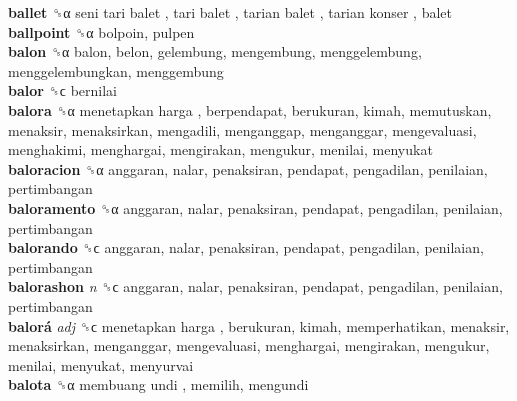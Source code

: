 \textbf{ballet} ␝α   seni tari balet ,  tari balet ,  tarian balet ,  tarian konser , balet  \\
\textbf{ballpoint} ␝α  bolpoin, pulpen  \\
\textbf{balon} ␝α  balon, belon, gelembung, mengembung, menggelembung, menggelembungkan, menggembung  \\
\textbf{balor} ␝ϲ  bernilai  \\
\textbf{balora} ␝α   menetapkan harga , berpendapat, berukuran, kimah, memutuskan, menaksir, menaksirkan, mengadili, menganggap, menganggar, mengevaluasi, menghakimi, menghargai, mengirakan, mengukur, menilai, menyukat  \\
\textbf{baloracion} ␝α  anggaran, nalar, penaksiran, pendapat, pengadilan, penilaian, pertimbangan  \\
\textbf{baloramento} ␝α  anggaran, nalar, penaksiran, pendapat, pengadilan, penilaian, pertimbangan  \\
\textbf{balorando} ␝ϲ  anggaran, nalar, penaksiran, pendapat, pengadilan, penilaian, pertimbangan  \\
\textbf{balorashon} \emph{n}  ␝ϲ  anggaran, nalar, penaksiran, pendapat, pengadilan, penilaian, pertimbangan  \\
\textbf{balorá} \emph{adj}  ␝ϲ   menetapkan harga , berukuran, kimah, memperhatikan, menaksir, menaksirkan, menganggar, mengevaluasi, menghargai, mengirakan, mengukur, menilai, menyukat, menyurvai  \\
\textbf{balota} ␝α   membuang undi , memilih, mengundi  \\
